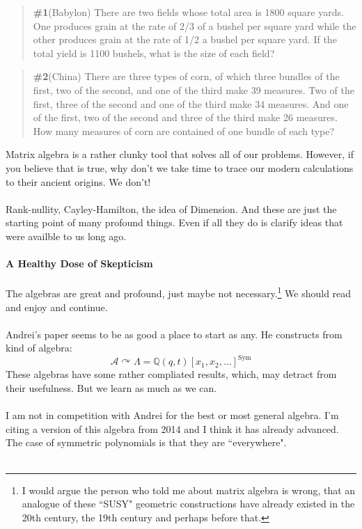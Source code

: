 \documentclass[12pt]{article}
\begin{document}
\begin{quotation}\textbf{\#1}(Babylon) There are two fields whose total area is 1800 square yards. One produces grain at the rate of 2/3 of a bushel per square yard while the other produces grain at the rate of 1/2 a bushel per square yard. If the total yield is 1100 bushels, what is the size of each field?
\end{quotation}
\begin{quotation}\textbf{\#2}(China) There are three types of corn, of which three bundles of the first, two of the second, and one of the third make 39 measures. Two of the first, three of the second and one of the third make 34 measures. And one of the first, two of the second and three of the third make 26 measures. How many measures of corn are contained of one bundle of each type?
\end{quotation}
\vspace{12pt}Matrix algebra is a rather clunky tool that solves all of our problems.  However, if you believe that is true, why don't we take time to trace our modern calculations to their ancient origins.  We don't!  \\ \\
Rank-nullity, Cayley-Hamilton, the idea of Dimension.  And these are just the starting point of many profound things.  Even if all they do is clarify ideas that were availble to us long ago. \\ \\
\textbf{A Healthy Dose of Skepticism} \\ \\
The algebras are great and profound, just maybe not necessary.\footnote{I would argue the person who told me about matrix algebra is wrong, that an analogue of these ``SUSY" geometric constructions have already existed in the 20th century, the 19th century and perhaps before that.} We should read and enjoy and continue. \\ \\
Andrei's paper seems to be as good a place to start as any.  He constructs from kind of algebra:
$$ \mathcal{A} \curvearrowright \Lambda = \mathbb{Q}(q,t)[x_1, x_2, \dots]^{\text{Sym}} $$
These algebras have some rather compliated results, which, may detract from their usefulness.  But we learn as much as we can. \\ \\
I am not in competition with Andrei for the best or most general algebra.  I'm citing a version of this algebra from 2014 and I think it has already advanced.  The case of symmetric polynomials is that they are ``everywhere". \\ \\
\end{document}
